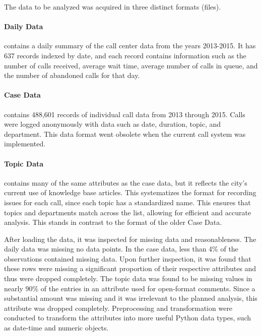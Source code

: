 \documentclass[12pt]{article}
\begin{document}
The data to be analyzed was acquired in three distinct formats (files).

\paragraph{Daily Data} contains a daily summary of the call center data from the years 2013-2015.  It has 637 records indexed by date, and each record contains information such as the number of calls received, average wait time, average number of calls in queue, and the number of abandoned calls for that day.

\paragraph{Case Data} contains 488,601 records of individual call data from 2013 through 2015.  Calls were logged anonymously with data such as date, duration, topic, and department.  This data format went obsolete when the current call system was implemented.

\paragraph{Topic Data} contains many of the same attributes as the case data, but it reflects  the city's current use of knowledge base articles.  This systematizes the format for recording issues for each call, since each topic has a standardized name.  This ensures that topics and departments match across the list, allowing for efficient and accurate analysis.  This stands in contrast to the format of the older Case Data.

\par

After loading the data, it was inspected for missing data and reasonableness.  The daily data was missing no data points.  In the case data, less than 4\% of the observations contained missing data.  Upon further inspection, it was found that these rows were missing a significant proportion of their respective attributes and thus were dropped completely.  The topic data was found to be missing values in nearly 90\% of the entries in an attribute used for open-format comments.  Since a substantial amount was missing and it was irrelevant to the planned analysis, this attribute was dropped completely.  Preprocessing and transformation were conducted to transform the attributes into more useful Python data types, such as date-time and numeric objects.
\end{document}
